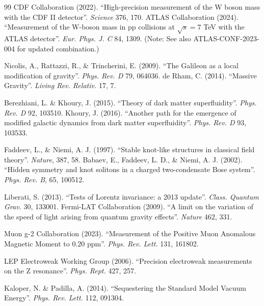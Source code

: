 \documentclass[a4paper,12pt]{article}
\begin{document}
\begin{thebibliography}{99}
 CDF Collaboration (2022). ``High-precision measurement of the W boson mass with the CDF II detector''. \textit{Science} 376, 170.
 ATLAS Collaboration (2024). ``Measurement of the W-boson mass in pp collisions at $\sqrt{s}=7$ TeV with the ATLAS detector''. \textit{Eur. Phys. J. C} 84, 1309. (Note: See also ATLAS-CONF-2023-004 for updated combination.)

 Nicolis, A., Rattazzi, R., \& Trincherini, E. (2009). ``The Galileon as a local modification of gravity''. \textit{Phys. Rev. D} 79, 064036.
 de Rham, C. (2014). ``Massive Gravity''. \textit{Living Rev. Relativ.} 17, 7.

 Berezhiani, L. \& Khoury, J. (2015). ``Theory of dark matter superfluidity''. \textit{Phys. Rev. D} 92, 103510.
 Khoury, J. (2016). ``Another path for the emergence of modified galactic dynamics from dark matter superfluidity''. \textit{Phys. Rev. D} 93, 103533.

 Faddeev, L., \& Niemi, A. J. (1997). ``Stable knot-like structures in classical field theory''. \textit{Nature}, 387, 58.
 Babaev, E., Faddeev, L. D., \& Niemi, A. J. (2002). ``Hidden symmetry and knot solitons in a charged two-condensate Bose system''. \textit{Phys. Rev. B}, 65, 100512.

 Liberati, S. (2013). ``Tests of Lorentz invariance: a 2013 update''. \textit{Class. Quantum Grav.} 30, 133001.
 Fermi-LAT Collaboration (2009). ``A limit on the variation of the speed of light arising from quantum gravity effects''. \textit{Nature} 462, 331.

 Muon g-2 Collaboration (2023). ``Measurement of the Positive Muon Anomalous Magnetic Moment to 0.20 ppm''. \textit{Phys. Rev. Lett.} 131, 161802.

 LEP Electroweak Working Group (2006). ``Precision electroweak measurements on the Z resonance''. \textit{Phys. Rept.} 427, 257.


 Kaloper, N. \& Padilla, A. (2014). ``Sequestering the Standard Model Vacuum Energy''. \textit{Phys. Rev. Lett.} 112, 091304.


\end{thebibliography}
\end{document}

